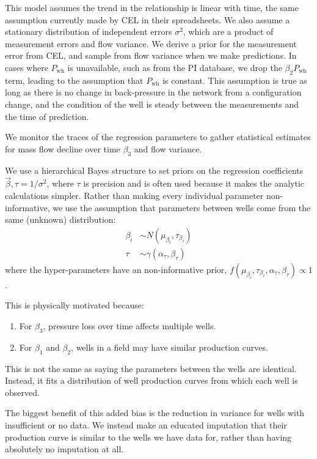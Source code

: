 \documentclass[a4paper, 12pt]{article}
\newlength{\drop}
\begin{document}
This model assumes the trend in the relationship is linear with time, the same assumption currently made by CEL in their spreadsheets. We also assume a stationary distribution of independent errors $\sigma^2$, which are a product of measurement errors and flow variance. We derive a prior for the measurement error from CEL, and sample from flow variance when we make predictions. In cases where $P_\text{wh}$ is unavailable, such as from the PI database, we drop the $\beta_2P_\text{wh}$ term, leading to the assumption that $P_\text{wh}$ is constant. This assumption is true as long as there is no change in back-pressure in the network from a configuration change, and the condition of the well is steady between the measurements and the time of prediction.

We monitor the traces of the regression parameters to gather statistical estimates for mass flow decline over time $\beta_3$ and flow variance.

We use a hierarchical Bayes structure to set priors on the regression coefficients $\vec{\beta},\tau=1/\sigma^2$, where $\tau$ is precision and is often used because it makes the analytic calculations simpler. Rather than making every individual parameter non-informative, we use the assumption that parameters between wells come from the same (unknown) distribution:
\begin{align}
\beta_i &\sim N\left( \mu_{\beta_i},\tau_{\beta_i} \right)\\
\tau &\sim \gamma\left(\alpha_\tau,\beta_\tau\right)
\end{align}
where the hyper-parameters have an non-informative prior, $f\left(\mu_{\beta_i},\tau_{\beta_i},\alpha_\tau,\beta_\tau\right) \propto 1$.
 
This is physically motivated because:

\begin{enumerate}
\item For $\beta_3$, pressure loss over time affects multiple wells.
\item For $\beta_1$ and $\beta_2$, wells in a field may have similar production curves.
\end{enumerate}

This is not the same as saying the parameters between the wells are identical. Instead, it fits a distribution of well production curves from which each well is observed.

The biggest benefit of this added bias is the reduction in variance for wells with insufficient or no data. We instead make an educated imputation that their production curve is similar to the wells we have data for, rather than having absolutely no imputation at all.
\end{document}
